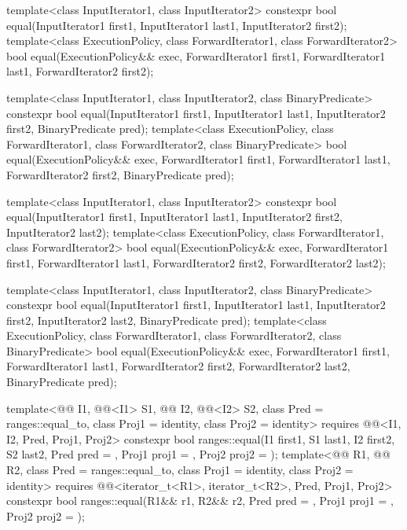 %
\begin{itemdecl}
template<class InputIterator1, class InputIterator2>
  constexpr bool equal(InputIterator1 first1, InputIterator1 last1,
                       InputIterator2 first2);
template<class ExecutionPolicy, class ForwardIterator1, class ForwardIterator2>
  bool equal(ExecutionPolicy&& exec,
             ForwardIterator1 first1, ForwardIterator1 last1,
             ForwardIterator2 first2);

template<class InputIterator1, class InputIterator2,
         class BinaryPredicate>
  constexpr bool equal(InputIterator1 first1, InputIterator1 last1,
                       InputIterator2 first2, BinaryPredicate pred);
template<class ExecutionPolicy, class ForwardIterator1, class ForwardIterator2,
         class BinaryPredicate>
  bool equal(ExecutionPolicy&& exec,
             ForwardIterator1 first1, ForwardIterator1 last1,
             ForwardIterator2 first2, BinaryPredicate pred);

template<class InputIterator1, class InputIterator2>
  constexpr bool equal(InputIterator1 first1, InputIterator1 last1,
                       InputIterator2 first2, InputIterator2 last2);
template<class ExecutionPolicy, class ForwardIterator1, class ForwardIterator2>
  bool equal(ExecutionPolicy&& exec,
             ForwardIterator1 first1, ForwardIterator1 last1,
             ForwardIterator2 first2, ForwardIterator2 last2);

template<class InputIterator1, class InputIterator2,
         class BinaryPredicate>
  constexpr bool equal(InputIterator1 first1, InputIterator1 last1,
                       InputIterator2 first2, InputIterator2 last2,
                       BinaryPredicate pred);
template<class ExecutionPolicy, class ForwardIterator1, class ForwardIterator2,
         class BinaryPredicate>
  bool equal(ExecutionPolicy&& exec,
             ForwardIterator1 first1, ForwardIterator1 last1,
             ForwardIterator2 first2, ForwardIterator2 last2,
             BinaryPredicate pred);

template<@@ I1, @@<I1> S1, @@ I2, @@<I2> S2,
         class Pred = ranges::equal_to, class Proj1 = identity, class Proj2 = identity>
  requires @@<I1, I2, Pred, Proj1, Proj2>
  constexpr bool ranges::equal(I1 first1, S1 last1, I2 first2, S2 last2,
                               Pred pred = {},
                               Proj1 proj1 = {}, Proj2 proj2 = {});
template<@@ R1, @@ R2, class Pred = ranges::equal_to,
         class Proj1 = identity, class Proj2 = identity>
  requires @@<iterator_t<R1>, iterator_t<R2>, Pred, Proj1, Proj2>
  constexpr bool ranges::equal(R1&& r1, R2&& r2, Pred pred = {},
                               Proj1 proj1 = {}, Proj2 proj2 = {});
\end{itemdecl}

